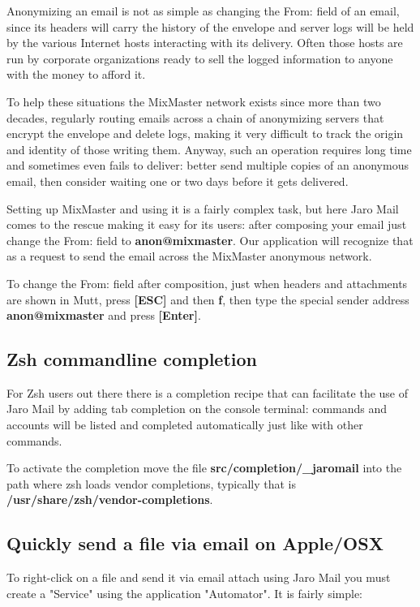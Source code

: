 \documentclass[a4,onecolumn,portrait]{article}
\begin{document}
Anonymizing an email is not as simple as changing the From: field
of an email, since its headers will carry the history of the
envelope and server logs will be held by the various Internet hosts
interacting with its delivery. Often those hosts are run by
corporate organizations ready to sell the logged information to
anyone with the money to afford it.

To help these situations the MixMaster network exists since more
than two decades, regularly routing emails across a chain of
anonymizing servers that encrypt the envelope and delete logs,
making it very difficult to track the origin and identity of those
writing them. Anyway, such an operation requires long time and
sometimes even fails to deliver: better send multiple copies of an
anonymous email, then consider waiting one or two days before it
gets delivered.

Setting up MixMaster and using it is a fairly complex task, but
here Jaro Mail comes to the rescue making it easy for its users:
after composing your email just change the From: field to
\textbf{anon@mixmaster}. Our application will recognize that as a request
to send the email across the MixMaster anonymous network.

To change the From: field after composition, just when headers and
attachments are shown in Mutt, press \textbf{[ESC]} and then \textbf{f}, then
type the special sender address \textbf{anon@mixmaster} and press \textbf{[Enter]}.
\subsection{Zsh commandline completion}
\label{sec-10-2}

For Zsh users out there there is a completion recipe that can
facilitate the use of Jaro Mail by adding tab completion on the
console terminal: commands and accounts will be listed and
completed automatically just like with other commands.

To activate the completion move the file \textbf{src/completion/\_jaromail}
into the path where zsh loads vendor completions, typically that is
\textbf{/usr/share/zsh/vendor-completions}.
\subsection{Quickly send a file via email on Apple/OSX}
\label{sec-10-3}

To right-click on a file and send it via email attach using Jaro
Mail you must create a "Service" using the application
"Automator". It is fairly simple:
\end{document}
